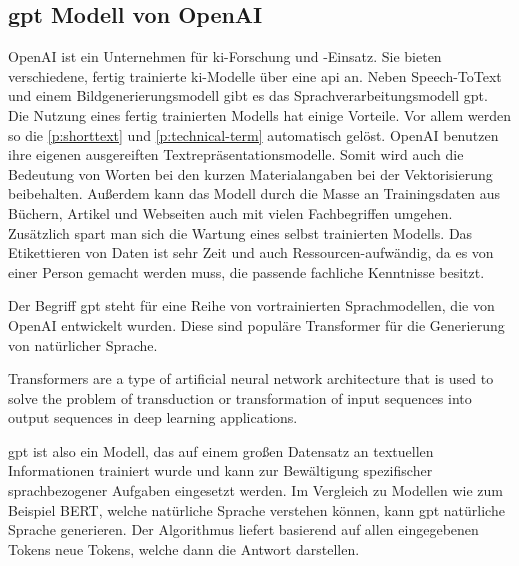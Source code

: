 

\subsection{\acf{gpt} Modell von OpenAI}
\label{c:conception:fine-structuring:openai}
OpenAI ist ein Unternehmen für \ac{ki}-Forschung und -Einsatz. Sie bieten verschiedene, fertig trainierte \ac{ki}-Modelle über eine \ac{api} an. Neben Speech-ToText und einem Bildgenerierungsmodell gibt es das Sprachverarbeitungsmodell \ac{gpt}. \citep[vgl.][]{openai_company}
Die Nutzung eines fertig trainierten Modells hat einige Vorteile. Vor allem werden so die \autoref{p:shorttext} und \autoref{p:technical-term} automatisch gelöst. OpenAI benutzen ihre eigenen ausgereiften Textrepräsentationsmodelle. Somit wird auch die Bedeutung von Worten bei den kurzen Materialangaben bei der Vektorisierung beibehalten. Außerdem kann das Modell durch die Masse an Trainingsdaten aus Büchern, Artikel und Webseiten auch mit vielen Fachbegriffen umgehen. Zusätzlich spart man sich die Wartung eines selbst trainierten Modells. Das Etikettieren von Daten ist sehr Zeit und auch Ressourcen-aufwändig, da es von einer Person gemacht werden muss, die passende fachliche Kenntnisse besitzt.

Der Begriff \ac{gpt} steht für eine Reihe von vortrainierten Sprachmodellen, die von OpenAI entwickelt wurden. Diese sind populäre Transformer für die Generierung von natürlicher Sprache. \citep[vgl.][]{zhu_luo_2022}
\begin{definition}[Transformer]
	\label{def:transformer}
	\glqq Transformers are a type of artificial neural network architecture that is used to solve the problem of transduction or transformation of input sequences into output sequences in deep learning applications. \grqq{} \citep{Rogel-Salazar2022-pd}
\end{definition}
\ac{gpt} ist also ein Modell, das auf einem großen Datensatz an textuellen Informationen trainiert wurde und kann zur Bewältigung spezifischer sprachbezogener Aufgaben eingesetzt werden. Im Vergleich zu Modellen wie zum Beispiel BERT, welche natürliche Sprache verstehen können, kann \ac{gpt} natürliche Sprache generieren. Der Algorithmus liefert basierend auf allen eingegebenen Tokens neue Tokens, welche dann die Antwort darstellen. \citep[vgl.][]{zhu_luo_2022}

